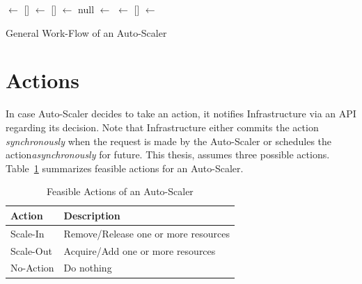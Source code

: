 \begin{description}[leftmargin=0pt]
\begin{algorithm}[ht]
        
        
        \impls $\gets$ [] \;
        \dec $\gets$ [] \;
        \finaldec $\gets$ null\;
        \BlankLine
         {
            \currentValue $\gets$ \GCMFME{} \;
            \dec $\gets$ [] \;
            \finaldec $\gets$ \GFD{\dec, \currentValue} \;
            \RIA{\finaldec}\;
        }
        \caption{General Work-Flow of an Auto-Scaler}
        \label{a:as-workflow}
    \end{algorithm}
\end{description}

\section{Actions}
\label{ias:actions}
In case Auto-Scaler decides to take an action, it notifies Infrastructure via an API regarding its decision. Note that Infrastructure either commits the action \emph{synchronously} when the request is made by the Auto-Scaler or schedules the action\emph{asynchronously} for future. This thesis, assumes three possible actions. Table~\ref{tab:actions-sum} summarizes feasible actions for an Auto-Scaler.
\begin{table}[!htbp]
    \begin{tabular}{ll}
        \toprule
        \textbf{Action} & \textbf{Description}\\
        \midrule
        Scale-In & Remove/Release one or more resources\\
        Scale-Out & Acquire/Add one or more resources\\
        No-Action & Do nothing\\
        \bottomrule
    \end{tabular}
    \centering
    \caption{Feasible Actions of an Auto-Scaler}
    \label{tab:actions-sum}
\end{table}

